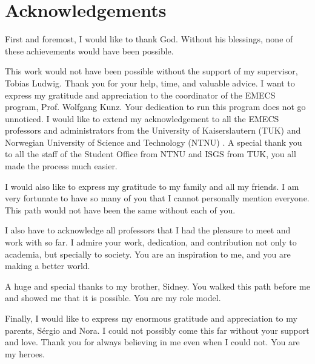 \chapter*{Acknowledgements}


First and foremost, I would like to thank God. Without his blessings, none of these achievements would have been possible.

This work would not have been possible without the support of my supervisor, Tobias Ludwig. Thank you for your help, time, and valuable advice. I want to express my gratitude and appreciation to the coordinator of the EMECS program, Prof. Wolfgang Kunz. Your dedication to run this program does not go unnoticed. I would like to extend my acknowledgement to all the EMECS professors and administrators from the University of Kaiserslautern (TUK) and Norwegian University of Science and Technology (NTNU) . A special thank you to all the staff of the Student Office from NTNU and ISGS from TUK, you all made the process much easier. 

I would also like to express my gratitude to my family and all my friends. I am very fortunate to have so many of you that I cannot personally mention everyone. This path would not have been the same without each of you.

I also have to acknowledge all professors that I had the pleasure to meet and work with so far. I admire your work, dedication, and contribution not only to academia, but specially to society. You are an inspiration to me, and you are making a better world. 

A huge and special thanks to my brother, Sidney. You walked this path before me and showed me that it is possible. You are my role model. 

Finally, I would like to express my enormous gratitude and appreciation to my parents, Sérgio and Nora. I could not possibly come this far without your support and love. Thank you for always believing in me even when I could not. You are my heroes.
